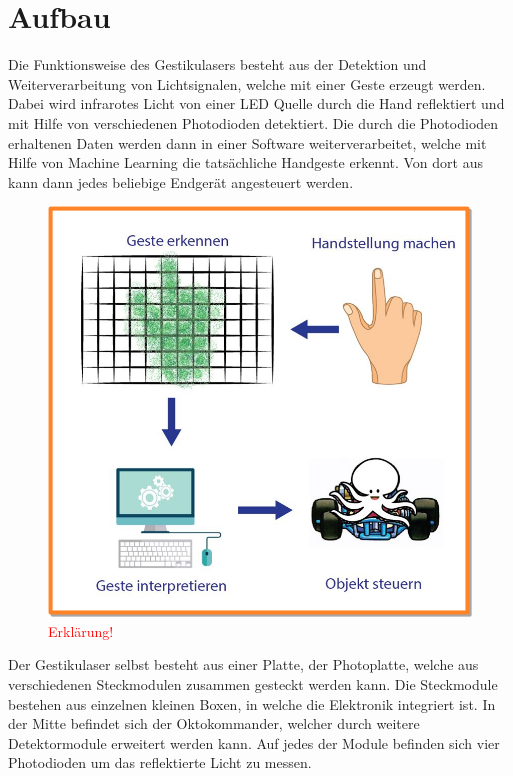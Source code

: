 \chapter{Aufbau}
\label{ch:Funktionsweise und Aufbau}
Die Funktionsweise des Gestikulasers besteht aus der Detektion und Weiterverarbeitung von Lichtsignalen, welche mit einer Geste erzeugt werden. Dabei wird infrarotes Licht von einer LED Quelle durch die Hand reflektiert und mit Hilfe von verschiedenen Photodioden detektiert. Die durch die Photodioden erhaltenen Daten werden dann in einer Software weiterverarbeitet, welche mit Hilfe von Machine Learning die tatsächliche Handgeste erkennt. Von dort aus kann dann jedes beliebige Endgerät angesteuert werden.

\begin{figure}[h]
	\centering
	\includegraphics[scale=0.8]{figures/AblaufGestikulaser.png}
	\caption{\textcolor{red}{Erklärung!}}
	\label{fig:AblaufGestikulaser}
\end{figure}

Der Gestikulaser selbst besteht aus einer Platte, der Photoplatte, welche aus verschiedenen Steckmodulen zusammen gesteckt werden kann. Die Steckmodule bestehen aus einzelnen kleinen Boxen, in welche die Elektronik integriert ist. In der Mitte befindet sich der Oktokommander, welcher durch weitere Detektormodule erweitert werden kann. Auf jedes der Module befinden sich vier Photodioden um das reflektierte Licht zu messen. 

